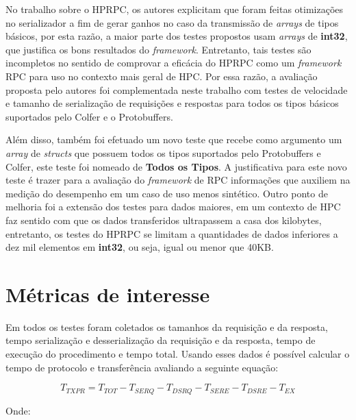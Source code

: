 No trabalho sobre o HPRPC, os autores explicitam que foram feitas otimizações no serializador a fim de gerar ganhos no caso da transmissão de \textit{arrays} de tipos básicos, por esta razão, a maior parte dos testes propostos usam \textit{arrays} de \textbf{int32}, que justifica os bons resultados do \textit{framework}. Entretanto, tais testes são incompletos no sentido de comprovar a eficácia do HPRPC como um \textit{framework} RPC para uso no contexto mais geral de HPC. Por essa razão, a avaliação proposta pelo autores foi complementada neste trabalho com testes de velocidade e tamanho de serialização de requisições e respostas para todos os tipos básicos suportados pelo Colfer e o Protobuffers. 

Além disso, também foi efetuado um novo teste que recebe como argumento um \textit{array} de \textit{structs} que possuem todos os tipos suportados pelo Protobuffers e Colfer, este teste foi nomeado de \textbf{Todos os Tipos}. A justificativa para este novo teste é trazer para a avaliação do \textit{framework} de RPC informações que auxiliem na medição do desempenho em um caso de uso menos sintético. Outro ponto de melhoria foi a extensão dos testes para dados maiores, em um contexto de HPC faz sentido com que os dados transferidos ultrapassem a casa dos kilobytes, entretanto, os testes do HPRPC se limitam a quantidades de dados inferiores a dez mil elementos em \textbf{int32}, ou seja, igual ou menor que 40KB.


\section{Métricas de interesse}
\label{sec:metricas_interesse}

Em todos os testes foram coletados os tamanhos da requisição e da resposta, tempo serialização e desserialização da requisição e da resposta, tempo de execução do procedimento e tempo total. Usando esses dados é possível calcular o tempo de protocolo e transferência avaliando a seguinte equação:

\begin{equation}  
\label{eq:tempo_transmissao_protocolo}
    T_{TXPR}  =  T_{TOT} - T_{SERQ} - T_{DSRQ} - T_{SERE} - T_{DSRE} - T_{EX}
\end{equation}

Onde: 

